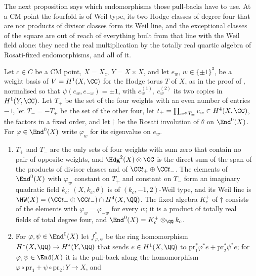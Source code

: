 The next proposition says which endomorphisms those pull-backs have to use.
At a CM point the fourfold is of Weil type, its two Hodge classes of degree
four that are not products of divisor classes form its Weil line, and the
exceptional classes of the square are out of reach of everything built from
that line with the Weil field alone: they need the real multiplication by the
totally real quartic algebra of Rosati-fixed endomorphisms, and all of it.

\begin{proposition}\label{prop:cmsource}
Let $c\in C$ be a CM point, $X=X_{c}$, $Y=X\times X$, and let $e_{w}$,
$w\in\{\pm1\}^{3}$, be a weight basis of $V=H^{1}(X,\CC)$ for the Hodge torus
$T$ of $X$, as in the proof of , normalised so that
$\psi(e_{w},e_{-w})=\pm1$, with $e^{(1)}_{w}$, $e^{(2)}_{w}$ its two copies in
$H^{1}(Y,\CC)$. Let $T_{+}$ be the set of the four weights with an even
number of entries $-1$, let $T_{-}=-T_{+}$ be the set of the other four, let
$t_{\pm}=\prod_{w\in T_{\pm}}e_{w}\in H^{4}(X,\CC)$, the factors in a fixed
order, and let $\dagger$ be the Rosati involution of $\theta$ on
$\End^{0}(X)$. For $\varphi\in\End^{0}(X)$ write $\varphi_{w}$ for its
eigenvalue on $e_{w}$.
\begin{enumerate}[label=\textup{(\roman*)},leftmargin=2.6em,itemsep=2pt]
\item $T_{+}$ and $T_{-}$ are the only sets of four weights with sum zero
  that contain no pair of opposite weights, and $\Hdg^{2}(X)\otimes\CC$ is
  the direct sum of the span of the products of divisor classes and of
  $\CC t_{+}\oplus\CC t_{-}$. The elements of $\End^{0}(X)$ with
  $\varphi_{w}$ constant on $T_{+}$ and constant on $T_{-}$ form an imaginary
  quadratic field $k_{c}$; $(X,k_{c},\theta)$ is of $(k_{c},-1,2)$-Weil type,
  and its Weil line is $\HW(X)=(\CC t_{+}\oplus\CC t_{-})\cap H^{4}(X,\QQ)$.
  The fixed algebra $K_{c}^{+}$ of $\dagger$ consists of the elements with
  $\varphi_{w}=\varphi_{-w}$ for every $w$; it is a product of totally real
  fields of total degree four, and $\End^{0}(X)=K_{c}^{+}\otimes_{\QQ}k_{c}$.
\item For $\varphi,\psi\in\End^{0}(X)$ let $f_{\varphi,\psi}^{*}$ be the ring
  homomorphism $H^{*}(X,\QQ)\to H^{*}(Y,\QQ)$ that sends $e\in H^{1}(X,\QQ)$
  to $\mathrm{pr}_{1}^{*}\varphi^{*}e+\mathrm{pr}_{2}^{*}\psi^{*}e$; for
  $\varphi,\psi\in\End(X)$ it is the pull-back along the homomorphism
  $\varphi\circ\mathrm{pr}_{1}+\psi\circ\mathrm{pr}_{2}\colon Y\to X$, and

\end{enumerate}
\end{proposition}
